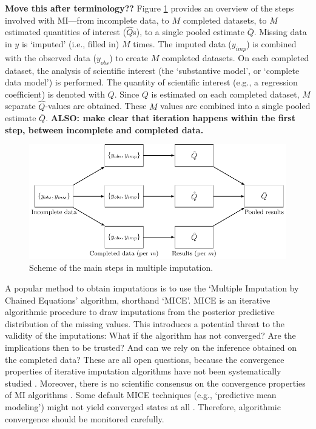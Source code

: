 \documentclass[Royal,times,sageh]{sagej}
\begin{document}
\textbf{Move this after terminology??} Figure \ref{fig:diagram} provides
an overview of the steps involved with MI---from incomplete data, to
\(M\) completed datasets, to \(M\) estimated quantities of interest
(\(\hat{Q}\)s), to a single pooled estimate \(\bar{Q}\). Missing data in
\(y\) is `imputed' (i.e., filled in) \(M\) times. The imputed data
(\(y_{imp}\)) is combined with the observed data (\(y_{obs}\)) to create
\(M\) completed datasets. On each completed dataset, the analysis of
scientific interest (the `substantive model', or `complete data model')
is performed. The quantity of scientific interest (e.g., a regression
coefficient) is denoted with \(Q\). Since \(Q\) is estimated on each
completed dataset, \(M\) separate \(\hat{Q}\)-values are obtained. These
\(M\) values are combined into a single pooled estimate \(\bar{Q}\).
\textbf{ALSO: make clear that iteration happens within the first step,
between incomplete and completed data.}

\begin{figure}

{\centering \includegraphics[width=\linewidth]{./images/diagram} 

}

\caption{Scheme of the main steps in multiple imputation.}\label{fig:diagram}
\end{figure}

A popular method to obtain imputations is to use the `Multiple
Imputation by Chained Equations' algorithm, shorthand
`MICE'\citep{mice}. MICE is an iterative algorithmic procedure to draw
imputations from the posterior predictive distribution of the missing
values. This introduces a potential threat to the validity of the
imputations: What if the algorithm has not converged? Are the
implications then to be trusted? And can we rely on the inference
obtained on the completed data? These are all open questions, because
the convergence properties of iterative imputation algorithms have not
been systematically studied \citep{buur18}. Moreover, there is no
scientific consensus on the convergence properties of MI algorithms
\citep{taka17}. Some default MICE techniques (e.g., `predictive mean
modeling') might not yield converged states at all \citep{murr18}.
Therefore, algorithmic convergence should be monitored carefully.
\end{document}
